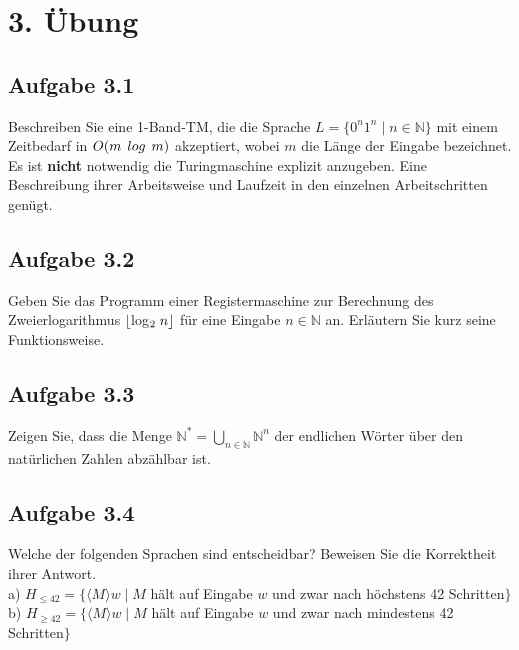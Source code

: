 \section*{3. Übung}
\subsection*{Aufgabe 3.1}
Beschreiben Sie eine 1-Band-TM, die die Sprache $L = \{0^n1^n \mid n \in \mathbb{N}\}$ mit einem Zeitbedarf in $O(m \hspace{0,15cm} log \hspace{0,15cm} m)$ akzeptiert, wobei $m$ die Länge der Eingabe bezeichnet.\\
Es ist \textbf{nicht} notwendig die Turingmaschine explizit anzugeben. Eine Beschreibung ihrer Arbeitsweise und Laufzeit in den einzelnen Arbeitschritten genügt.
\subsection*{Aufgabe 3.2} Geben Sie das Programm einer Registermaschine zur Berechnung des Zweierlogarithmus $\lfloor $log$_2 \hspace{0,1cm} n \rfloor$ für eine Eingabe $n \in \mathbb{N}$ an. Erläutern Sie kurz seine Funktionsweise.
\subsection*{Aufgabe 3.3}
Zeigen Sie, dass die Menge $\mathbb{N}^* = \bigcup_{n \in \mathbb{N}} \mathbb{N}^n$ der endlichen Wörter über den natürlichen Zahlen abzählbar ist.
\subsection*{Aufgabe 3.4}
Welche der folgenden Sprachen sind entscheidbar? Beweisen Sie die Korrektheit ihrer Antwort.\\
a) $H_{\leq 42} = \{\langle M \rangle w \mid M$ hält auf Eingabe $w$ und zwar nach höchstens 42 Schritten$\}$\\
b) $H_{\geq 42} = \{\langle M \rangle w \mid M$ hält auf Eingabe $w$ und zwar nach mindestens 42 Schritten$\}$